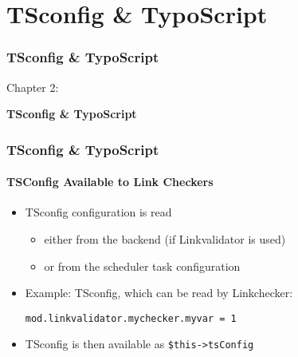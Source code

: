 %

\section{TSconfig \& TypoScript}
\begin{frame}[fragile]
	\frametitle{TSconfig \& TypoScript}

	\begin{center}\huge{Chapter 2:}\end{center}
	\begin{center}\huge{\color{typo3darkgrey}\textbf{TSconfig \& TypoScript}}\end{center}

\end{frame}


\begin{frame}[fragile]
	\frametitle{TSconfig \& TypoScript}
	\framesubtitle{TSConfig Available to Link Checkers}

	\begin{itemize}
		\item TSconfig configuration is read

			\begin{itemize}
				\item either from the backend (if Linkvalidator is used) 
				\item or from the scheduler task configuration 
			\end{itemize}

		\item Example: TSconfig, which can be read by Linkchecker:

			\lstinline!mod.linkvalidator.mychecker.myvar = 1!

		\item TSconfig is then available as \texttt{\$this->tsConfig}
	\end{itemize}

\end{frame}

